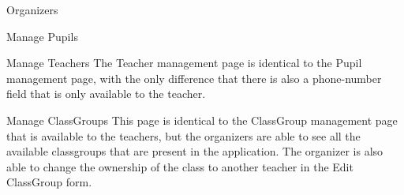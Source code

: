 \begin{section}{Organizers}
\begin{subsection}{Manage Pupils}
	\end{subsection}
	
	\begin{subsection}{Manage Teachers}
		The Teacher management page is identical to the Pupil management page, with the
		only difference that there is also a phone-number field that is only available
		to the teacher.
	\end{subsection}
	
	\begin{subsection}{Manage ClassGroups}
		This page is identical to the ClassGroup management page that is available to the
		teachers, but the organizers are able to see all the available classgroups that
		are present in the application. The organizer is also able to change the ownership
		of the class to another teacher in the Edit ClassGroup form.
	\end{subsection}
	

\end{section}
